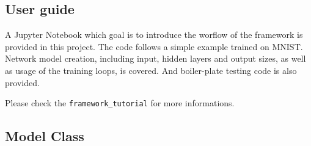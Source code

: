 \documentclass[english]{article}
\begin{document}
\subsection{User guide}
A Jupyter Notebook which goal is to introduce the worflow of the framework is provided in this project. The code follows a simple example trained on MNIST. Network model creation, including input, hidden layers and output sizes, as well as usage of the training loops, is covered. And boiler-plate testing code is also provided.

Please check the \texttt{framework\_tutorial} for more informations.



\subsection{Model Class}






\end{document}
